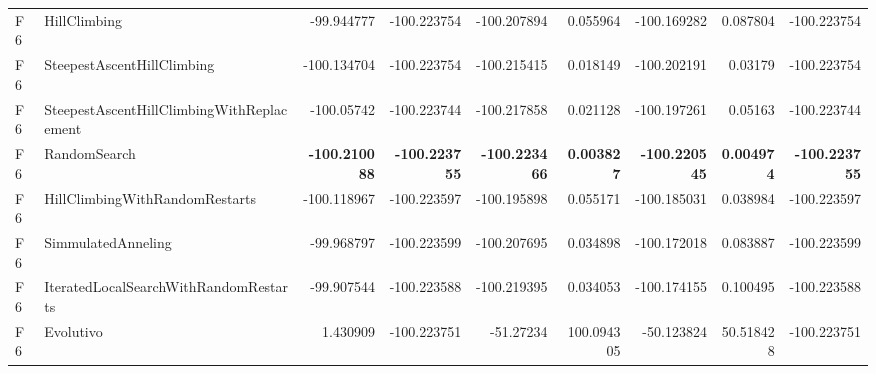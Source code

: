 \begin{tabular}{llrrrrrrr}
\midrule
F6 & HillClimbing & -99.944777 & -100.223754 & -100.207894 & 0.055964 & -100.169282 & 0.087804 & -100.223754 \\ 
F6 & SteepestAscentHillClimbing & -100.134704 & -100.223754 & -100.215415 & 0.018149 & -100.202191 & 0.03179 & -100.223754 \\ 
F6 & SteepestAscentHillClimbingWithReplacement & -100.05742 & -100.223744 & -100.217858 & 0.021128 & -100.197261 & 0.05163 & -100.223744 \\ 
F6 & RandomSearch & \textbf{-100.210088} & \textbf{-100.223755} & \textbf{-100.223466} & \textbf{0.003827} & \textbf{-100.220545} & \textbf{0.004974} & \textbf{-100.223755} \\ 
F6 & HillClimbingWithRandomRestarts & -100.118967 & -100.223597 & -100.195898 & 0.055171 & -100.185031 & 0.038984 & -100.223597 \\ 
F6 & SimmulatedAnneling & -99.968797 & -100.223599 & -100.207695 & 0.034898 & -100.172018 & 0.083887 & -100.223599 \\ 
F6 & IteratedLocalSearchWithRandomRestarts & -99.907544 & -100.223588 & -100.219395 & 0.034053 & -100.174155 & 0.100495 & -100.223588 \\ 
F6 & Evolutivo & 1.430909 & -100.223751 & -51.27234 & 100.094305 & -50.123824 & 50.518428 & -100.223751 \\ 
\bottomrule
\end{tabular}
